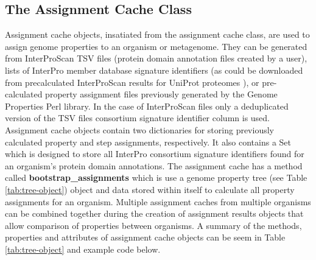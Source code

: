 \subsection{The Assignment Cache Class}

Assignment cache objects, insatiated from the assignment cache class, are used to assign genome properties to an organism or metagenome. They can be generated from InterProScan TSV files (protein domain annotation files created by a user), lists of InterPro member database signature identifiers (as could be downloaded from precalculated InterProScan results for UniProt proteomes \cite{uniprot2014uniprot}), or pre-calculated property assignment files previously generated by the Genome Properties Perl library. In the case of InterProScan files only a deduplicated version of the TSV files consortium signature identifier column is used.  Assignment cache objects contain two dictionaries for storing previously calculated property and step assignments, respectively. It also contains a Set which is designed to store all InterPro consortium signature identifiers found for an organism's protein domain annotations. The assignment cache has a method called \textbf{bootstrap\_assignments} which is use a genome property tree (see Table \ref{tab:tree-object}) object and data stored within itself to calculate all property assignments for an organism. Multiple assignment caches from multiple organisms can be combined together during the creation of assignment results objects that allow comparison of properties between organisms. A summary of the methods, properties and attributes of assignment cache objects can be seem in Table \ref{tab:tree-object} and example code below.

